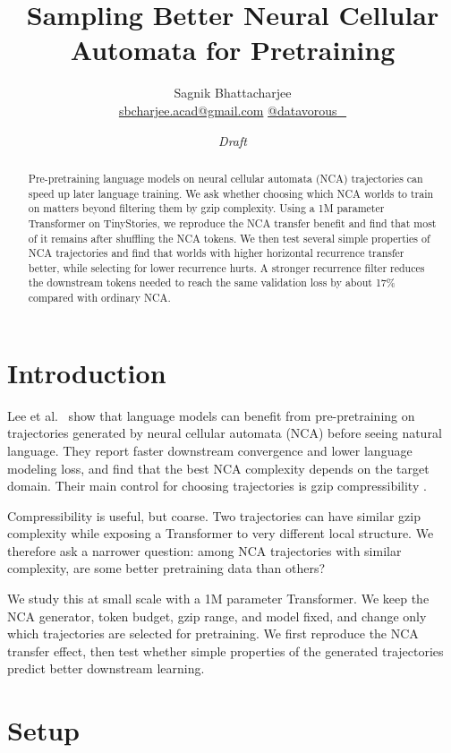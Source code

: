 \documentclass[10pt]{article}
\title{\vspace{-0.6em}\textbf{Sampling Better Neural Cellular Automata for Pretraining}\vspace{-0.2em}}
\author{Sagnik Bhattacharjee\\
\href{mailto:sbcharjee.acad@gmail.com}{sbcharjee.acad@gmail.com}\quad
\href{https://x.com/datavorous_}{@datavorous\_}}
\date{\textit{Draft}}
\begin{document}
\maketitle
\vspace{-1.2em}

\begin{abstract}
\noindent Pre-pretraining language models on neural cellular automata (NCA) trajectories can speed up later language training. We ask whether choosing which NCA worlds to train on matters beyond filtering them by gzip complexity. Using a 1M parameter Transformer on TinyStories, we reproduce the NCA transfer benefit and find that most of it remains after shuffling the NCA tokens. We then test several simple properties of NCA trajectories and find that worlds with higher horizontal recurrence transfer better, while selecting for lower recurrence hurts. A stronger recurrence filter reduces the downstream tokens needed to reach the same validation loss by about 17\% compared with ordinary NCA.
\end{abstract}

\section{Introduction}

Lee et al.\ \citep{lee2026nca} show that language models can benefit from pre-pretraining on trajectories generated by neural cellular automata (NCA) before seeing natural language. They report faster downstream convergence and lower language modeling loss, and find that the best NCA complexity depends on the target domain. Their main control for choosing trajectories is gzip compressibility \citep{deutsch1996gzip}.

Compressibility is useful, but coarse. Two trajectories can have similar gzip complexity while exposing a Transformer to very different local structure. We therefore ask a narrower question: among NCA trajectories with similar complexity, are some better pretraining data than others?

We study this at small scale with a 1M parameter Transformer. We keep the NCA generator, token budget, gzip range, and model fixed, and change only which trajectories are selected for pretraining. We first reproduce the NCA transfer effect, then test whether simple properties of the generated trajectories predict better downstream learning.

\section{Setup}
\end{document}
